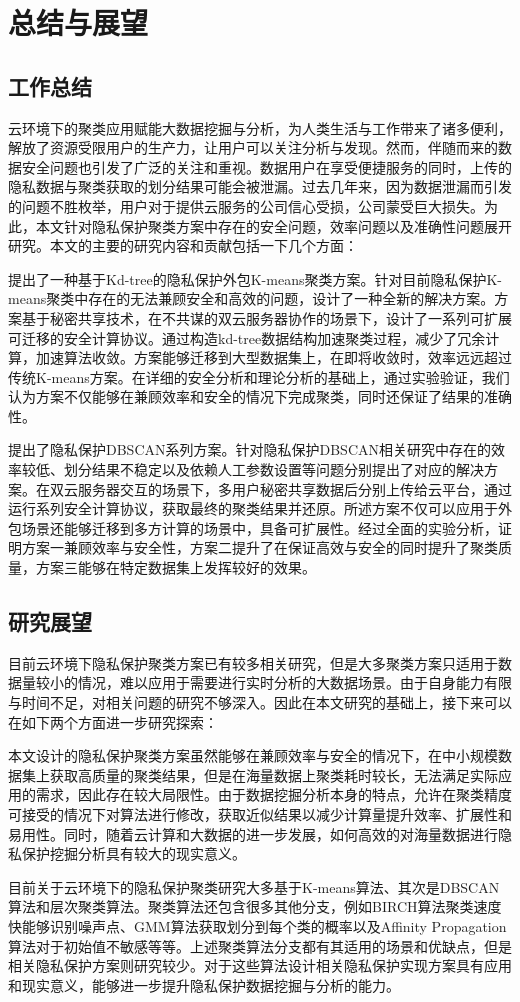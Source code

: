 \chapter{总结与展望}
\section{工作总结}
云环境下的聚类应用赋能大数据挖掘与分析，为人类生活与工作带来了诸多便利，解放了资源受限用户的生产力，让用户可以关注分析与发现。然而，伴随而来的数据安全问题也引发了广泛的关注和重视。数据用户在享受便捷服务的同时，上传的隐私数据与聚类获取的划分结果可能会被泄漏。过去几年来，因为数据泄漏而引发的问题不胜枚举，用户对于提供云服务的公司信心受损，公司蒙受巨大损失。为此，本文针对隐私保护聚类方案中存在的安全问题，效率问题以及准确性问题展开研究。本文的主要的研究内容和贡献包括一下几个方面：

\begin{compactitem}
	\item 
	提出了一种基于Kd-tree的隐私保护外包K-means聚类方案。针对目前隐私保护K-means聚类中存在的无法兼顾安全和高效的问题，设计了一种全新的解决方案。方案基于秘密共享技术，在不共谋的双云服务器协作的场景下，设计了一系列可扩展可迁移的安全计算协议。通过构造kd-tree数据结构加速聚类过程，减少了冗余计算，加速算法收敛。方案能够迁移到大型数据集上，在即将收敛时，效率远远超过传统K-means方案。在详细的安全分析和理论分析的基础上，通过实验验证，我们认为方案不仅能够在兼顾效率和安全的情况下完成聚类，同时还保证了结果的准确性。
	\item 
	提出了隐私保护DBSCAN系列方案。针对隐私保护DBSCAN相关研究中存在的效率较低、划分结果不稳定以及依赖人工参数设置等问题分别提出了对应的解决方案。在双云服务器交互的场景下，多用户秘密共享数据后分别上传给云平台，通过运行系列安全计算协议，获取最终的聚类结果并还原。所述方案不仅可以应用于外包场景还能够迁移到多方计算的场景中，具备可扩展性。经过全面的实验分析，证明方案一兼顾效率与安全性，方案二提升了在保证高效与安全的同时提升了聚类质量，方案三能够在特定数据集上发挥较好的效果。
\end{compactitem}

\section{研究展望}
目前云环境下隐私保护聚类方案已有较多相关研究，但是大多聚类方案只适用于数据量较小的情况，难以应用于需要进行实时分析的大数据场景。由于自身能力有限与时间不足，对相关问题的研究不够深入。因此在本文研究的基础上，接下来可以在如下两个方面进一步研究探索：

本文设计的隐私保护聚类方案虽然能够在兼顾效率与安全的情况下，在中小规模数据集上获取高质量的聚类结果，但是在海量数据上聚类耗时较长，无法满足实际应用的需求，因此存在较大局限性。由于数据挖掘分析本身的特点，允许在聚类精度可接受的情况下对算法进行修改，获取近似结果以减少计算量提升效率、扩展性和易用性。同时，随着云计算和大数据的进一步发展，如何高效的对海量数据进行隐私保护挖掘分析具有较大的现实意义。

目前关于云环境下的隐私保护聚类研究大多基于K-means算法、其次是DBSCAN算法和层次聚类算法。聚类算法还包含很多其他分支，例如BIRCH算法聚类速度快能够识别噪声点、GMM算法获取划分到每个类的概率以及Affinity Propagation算法对于初始值不敏感等等。上述聚类算法分支都有其适用的场景和优缺点，但是相关隐私保护方案则研究较少。对于这些算法设计相关隐私保护实现方案具有应用和现实意义，能够进一步提升隐私保护数据挖掘与分析的能力。
